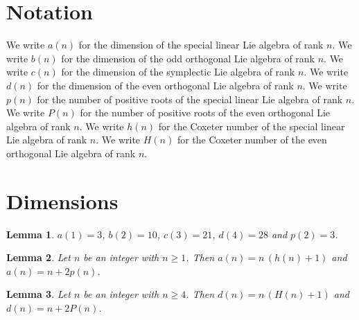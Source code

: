 \documentclass{article}
\newtheorem{lemma}{Lemma}
\begin{document}
\section{Notation}

We write $a(n)$ for the dimension of the special linear Lie algebra of rank $n$.
We write $b(n)$ for the dimension of the odd orthogonal Lie algebra of rank $n$.
We write $c(n)$ for the dimension of the symplectic Lie algebra of rank $n$.
We write $d(n)$ for the dimension of the even orthogonal Lie algebra of rank $n$.
We write $p(n)$ for the number of positive roots of the special linear Lie algebra of rank $n$.
We write $P(n)$ for the number of positive roots of the even orthogonal Lie algebra of rank $n$.
We write $h(n)$ for the Coxeter number of the special linear Lie algebra of rank $n$.
We write $H(n)$ for the Coxeter number of the even orthogonal Lie algebra of rank $n$.

\section{Dimensions}

\begin{lemma}\label{values}
$a(1)=3$, $b(2)=10$, $c(3)=21$, $d(4)=28$ and $p(2)=3$.
\end{lemma}

\begin{lemma}\label{typeA}
Let $n$ be an integer with $n\ge1$. Then $a(n)=n\,(h(n)+1)$ and $a(n)=n+2p(n)$.
\end{lemma}

\begin{lemma}\label{typeD}
Let $n$ be an integer with $n\ge4$. Then $d(n)=n\,(H(n)+1)$ and $d(n)=n+2P(n)$.
\end{lemma}
\end{document}
